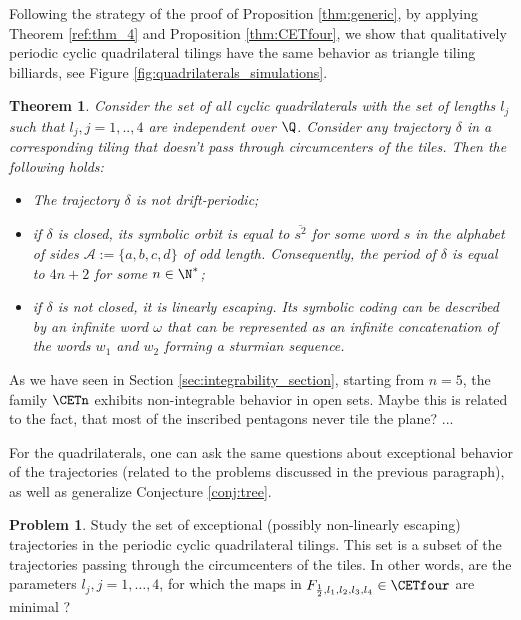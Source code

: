 \documentclass[12pt]{article}
\newtheorem{theorem}{Theorem}
\theoremstyle{definition}
\newtheorem*{problem}{Problem}
\begin{document}
Following the strategy of the proof of Proposition \ref{thm:generic}, by applying Theorem \ref{ref:thm_4} and Proposition \ref{thm:CETfour}, we show that qualitatively periodic cyclic quadrilateral tilings have the same behavior as triangle tiling billiards, see Figure \ref{fig:quadrilaterals_simulations}. 

\begin{theorem}\label{thm:minimality_4}
Consider the set of all cyclic quadrilaterals with the set of lengths $l_j$ such that $l_j, j=1,..,4$ are independent over $\Q$. Consider any trajectory $\delta$ in a corresponding tiling that doesn't pass through circumcenters of the tiles. Then the following holds:
\begin{itemize}
\item[1.] The trajectory $\delta$ is not drift-periodic;
\item[2.] if $\delta$ is closed, its symbolic orbit is equal to $\overline{s^2}$ for some word $s$ in the alphabet of sides $\mathcal{A}:=\{a,b,c,d\}$ of odd length. Consequently, the period of $\delta$ is equal to $4n+2$ for some $n \in \N^*$;
\item[3.] if $\delta$ is not closed, it is linearly escaping. Its symbolic coding can be described by an infinite word $\omega$ that can be represented as an infinite concatenation of the words $w_1$ and $w_2$ forming a sturmian sequence.
\end{itemize}
\end{theorem}

As we have seen in Section \ref{sec:integrability_section}, starting from $n=5$, the family $\CETn$ exhibits non-integrable behavior in open sets. Maybe this is related to the fact, that most of the inscribed pentagons never tile the plane? ...

For the quadrilaterals, one can ask the same questions about exceptional behavior of the trajectories (related to the problems discussed in the previous paragraph), as well as generalize Conjecture \ref{conj:tree}.

\begin{problem}
Study the set of exceptional (possibly non-linearly escaping) trajectories in the periodic cyclic quadrilateral tilings. This set is a subset of the trajectories passing through the circumcenters of the tiles. In other words, are the parameters $l_j, j=1, \ldots, 4$, for which the maps in $F_{\frac{1}{2}, l_1, l_2, l_3, l_4} \in \CETfour$ are minimal ?
\end{problem}
\end{document}
